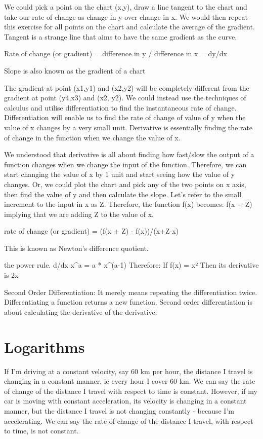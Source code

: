 We could pick a point on the chart (x,y), draw a line tangent to the chart and take our rate of change as change in y over change in x. We would then repeat this exercise for all points on the chart and calculate the average of the gradient.
Tangent is a strange line that aims to have the same gradient as the curve.

Rate of change (or gradient) = difference in y / difference in x = dy/dx

Slope is also known as the gradient of a chart

The gradient at point (x1,y1) and (x2,y2) will be completely different from the gradient at point (y4,x3) and (x2, y2).
We could instead use the techniques of calculus and utilise differentiation to find the instantaneous rate of change. Differentiation will enable us to find the rate of change of value of y when the value of x changes by a very small unit. Derivative is essentially finding the rate of change in the function when we change the value of x.

We understood that derivative is all about finding how fast/slow the output of a function changes when we change the input of the function. Therefore, we can start changing the value of x by 1 unit and start seeing how the value of y changes. Or, we could plot the chart and pick any of the two points on x axis, then find the value of y and then calculate the slope.
Let’s refer to the small increment to the input in x as Z.
Therefore, the function f(x) becomes: f(x + Z) implying that we are adding Z to the value of x.

rate of change (or gradient) = (f(x + Z) - f(x))/(x+Z-x)

This is known as Newton’s difference quotient.

the power rule.
d/dx x^a = a * x^(a-1)
Therefore: If f(x) = x² Then its derivative is 2x

Second Order Differentiation:
It merely means repeating the differentiation twice. Differentiating a function returns a new function. Second order differentiation is about calculating the derivative of the derivative:


\section{Logarithms}
If I'm driving at a constant velocity, say 60 km per hour, the distance I travel is changing in a constant manner, ie every hour I cover 60 km. We can say the rate of change of the distance I travel with respect to time is constant. However, if my car is moving with constant acceleration, its velocity is changing in a constant manner, but the distance I travel is not changing constantly - because I'm accelerating. We can say the rate of change of the distance I travel, with respect to time, is not constant.


